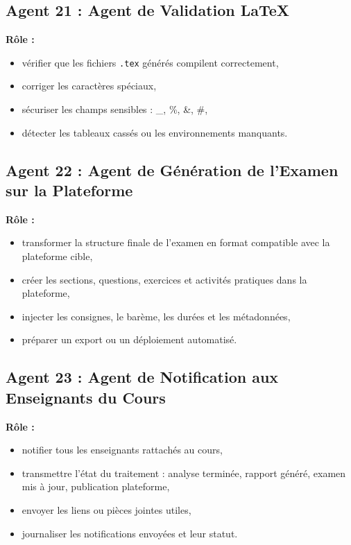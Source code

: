 \documentclass[12pt,a4paper]{article}
\begin{document}
\subsection*{Agent 21 : Agent de Validation LaTeX}

\textbf{Rôle :}
\begin{itemize}[leftmargin=1cm]
    \item vérifier que les fichiers \texttt{.tex} générés compilent correctement,
    \item corriger les caractères spéciaux,
    \item sécuriser les champs sensibles : \_, \%, \&, \#,
    \item détecter les tableaux cassés ou les environnements manquants.
\end{itemize}

\subsection*{Agent 22 : Agent de Génération de l’Examen sur la Plateforme}

\textbf{Rôle :}
\begin{itemize}[leftmargin=1cm]
    \item transformer la structure finale de l’examen en format compatible avec la plateforme cible,
    \item créer les sections, questions, exercices et activités pratiques dans la plateforme,
    \item injecter les consignes, le barème, les durées et les métadonnées,
    \item préparer un export ou un déploiement automatisé.
\end{itemize}

\subsection*{Agent 23 : Agent de Notification aux Enseignants du Cours}

\textbf{Rôle :}
\begin{itemize}[leftmargin=1cm]
    \item notifier tous les enseignants rattachés au cours,
    \item transmettre l’état du traitement : analyse terminée, rapport généré, examen mis à jour, publication plateforme,
    \item envoyer les liens ou pièces jointes utiles,
    \item journaliser les notifications envoyées et leur statut.
\end{itemize}
\end{document}
